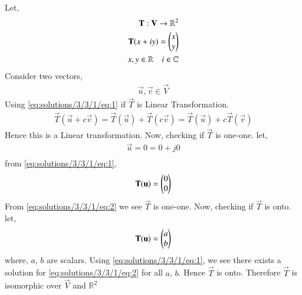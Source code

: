Let,
\begin{align}
\mathbf{T} : \mathbf{V} \rightarrow \mathbb{R}^2\\
\mathbf{T}(x+iy)=\begin{pmatrix}x\\y\end{pmatrix} \label{eq:solutions/3/3/1/eq:1}\\
x,y \in \mathbb{R} \quad i \in \mathbb{C}
\end{align}
Consider two vectors,
\begin{align}
\vec{u},\vec{v} \in \vec{V} 
\end{align}
Using \eqref{eq:solutions/3/3/1/eq:1} if $\vec{T}$ is Linear Transformation. 
\begin{align}
\vec{T}(\vec{u}+c\vec{v})= \vec{T}(\vec{u})+\vec{T}(c\vec{v})=\vec{T}(\vec{u})+c\vec{T}(\vec{v})
\end{align}
Hence this is a Linear transformation. Now, checking if $\vec{T}$ is one-one. let,
\begin{align}
\vec{u}=0 = 0+j0\\
\end{align}
from \eqref{eq:solutions/3/3/1/eq:1},
\begin{align}
\mathbf{T}(\mathbf{u})=\begin{pmatrix}0\\0\end{pmatrix}\label{eq:solutions/3/3/1/eq:2}
\end{align}
From \eqref{eq:solutions/3/3/1/eq:2} we see $\vec{T}$ is one-one. Now, checking if $\vec{T}$ is onto. let,
\begin{align}
\mathbf{T}(\mathbf{u}) =\begin{pmatrix}a\\b\end{pmatrix} \label{eq:solutions/3/3/1/eq:3}
\end{align}
where, $a$, $b$ are scalars. Using \eqref{eq:solutions/3/3/1/eq:1}, we see there exists a solution for \eqref{eq:solutions/3/3/1/eq:2} for all $a$, $b$. Hence $\vec{T}$ is onto. Therefore $\vec{T}$ is isomorphic over $\vec{V}$ and $\mathbb{R}^2$

